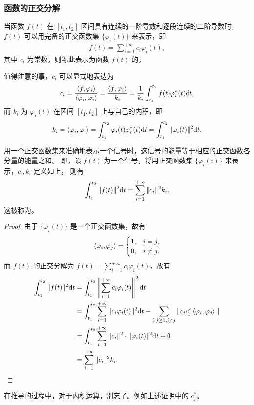 \subsubsection{函数的正交分解}

\begin{definition}[函数的正交分解]
    当函数 $f(t)$ 在 $[t_1, t_2]$ 区间具有连续的一阶导数和逐段连续的二阶导数时，
    $f(t)$ 可以用完备的正交函数集 $\{\varphi_i(t)\}$ 来表示，即
    \begin{align*}
        f(t) = \sum_{i = 1}^{+\infty}c_i\varphi_i(t),
    \end{align*}
    其中 $c_i$ 为常数，则称此表示为函数 $f(t)$ 的。

    值得注意的事，$c_i$ 可以显式地表达为
    \begin{align*}
        c_i = \frac{\left\langle f, \varphi_i\right\rangle}{\left\langle\varphi_i, \varphi_i\right\rangle}
            = \frac{\left\langle f, \varphi_i\right\rangle}{k_i}
            = \frac{1}{k_i}\int_{t_1}^{t_2}f(t)\varphi_i^*(t)\mathrm{d}t,
    \end{align*}
    而 $k_i$ 为 $\varphi_i(t)$ 在区间 $[t_1, t_2]$ 上与自己的内积，即
    \begin{align*}
        k_i = \left\langle\varphi_i, \varphi_i\right\rangle = \int_{t_1}^{t_2}\varphi_i(t)\varphi_i^*(t)\mathrm{d}t
        = \int_{t_1}^{t_2}\|\varphi_i(t)\|^2\mathrm{d}t.
    \end{align*}
\end{definition}

\begin{theorem}[帕斯瓦尔定理]
    用一个正交函数集来准确地表示一个信号时，这信号的能量等于相应的正交函数各分量的能量之和。
    即，设 $f(t)$ 为一个信号，将用正交函数集 $\{\varphi_i(t)\}$ 来表示，$c_i, k_i$ 定义如上，
    则有
    \begin{align*}
        \int_{t_1}^{t_2}\|f(t)\|^2\mathrm{d}t = \sum_{i = 1}^{+\infty}\|c_i\|^2k_i.
    \end{align*}
    这被称为。
\end{theorem}

\begin{proof}
    由于 $\{\varphi_i(t)\}$ 是一个正交函数集，故有
    \begin{align*}
        \left\langle\varphi_i, \varphi_j\right\rangle = \begin{cases}
            1, & i = j, \\
            0, & i \neq j.
        \end{cases}
    \end{align*}
    而 $f(t)$ 的正交分解为 $f(t) = \sum_{i = 1}^{+\infty}c_i\varphi_i(t)$，故有
    \begin{align*}
        \int_{t_1}^{t_2}\|f(t)\|^2\mathrm{d}t & = \int_{t_1}^{t_2}\left\|\sum_{i = 1}^{+\infty}c_i\varphi_i(t)\right\|^2\mathrm{d}t \\
        & = \int_{t_1}^{t_2}\sum_{i = 1}^{+\infty}\|c_i\varphi_i(t)\|^2\mathrm{d}t
            + \sum_{i, j \ge 1, i \neq j}\|c_ic_j^*\left\langle\varphi_i, \varphi_j\right\rangle\| \\
        & = \int_{t_1}^{t_2}\sum_{i = 1}^{+\infty}\|c_i\|^2\cdot \|\varphi_i(t)\|^2\mathrm{d}t + 0 \\
        & = \sum_{i = 1}^{+\infty}\|c_i\|^2k_i.
    \end{align*}
\end{proof}

\begin{note}
    在推导的过程中，对于内积运算，别忘了。例如上述证明中的 $c_j^*$。
\end{note}

